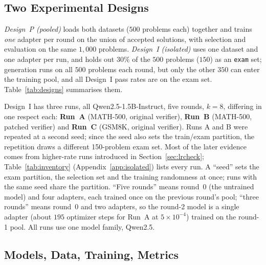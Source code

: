 \documentclass[runningheads]{llncs}
\begin{document}
\subsection{Two Experimental Designs}
\label{sec:designs}

\emph{Design~P (pooled)} loads both datasets ($500$ problems each) together and
trains \emph{one} adapter per round on the union of accepted solutions, with
selection and evaluation on the same $1{,}000$ problems. \emph{Design~I
(isolated)} uses one dataset and one adapter per run, and holds out $30\%$ of the
$500$ problems ($150$) as an \texttt{exam} set; generation runs on all $500$
problems each round, but only the other $350$ can enter the training pool, and
all Design~I pass rates are on the exam set. Table~\ref{tab:designs} summarises
them.

Design~I has three runs, all Qwen2.5-1.5B-Instruct, five rounds, $k=8$, differing
in one respect each: \textbf{Run~A} (MATH-500, original verifier), \textbf{Run~B}
(MATH-500, patched verifier) and \textbf{Run~C} (GSM8K, original verifier). Runs
A and B were repeated at a second seed; since the seed also sets the train/exam
partition, the repetition draws a different 150-problem exam set. Most of the
later evidence comes from higher-rate runs introduced in
Section~\ref{sec:lrcheck}; Table~\ref{tab:inventory} (Appendix~\ref{app:isolated}) lists every run. A
``seed'' sets the exam partition, the selection set and the training randomness
at once; runs with the same seed share the partition. ``Five rounds'' means
round~0 (the untrained model) and four adapters, each trained once on the
previous round's pool; ``three rounds'' means round~0 and two adapters, so the
round-2 model is a single adapter (about $195$ optimizer steps for Run~A at
$5\times10^{-4}$) trained on the round-1 pool. All runs use one model family,
Qwen2.5.

\subsection{Models, Data, Training, Metrics}
\label{sec:config}
\end{document}
